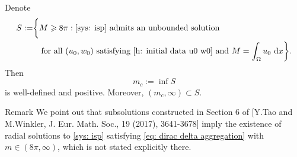 \begin{frame}

\begin{corollary}
	Denote
	\begin{equation}\nonumber
	\begin{split}
	S:= &\biggl\{ M \geqslant 8\pi :
        \eqref{sys: isp} \text{ admits an unbounded solution }\\
    &\quad\text{for all } (u_0, w_0) \text{ satisfying } \eqref{h: initial data u0 w0} \text{ and } M=\int_\Omega u_0\ \mathrm d{x}\biggr\}.
	\end{split}
	\end{equation}
	Then
	\[m_c := \inf S\]
is well-defined and positive. Moreover, $(m_c,\infty)\subset S$.
\end{corollary}

\begin{block}{Remark}
  We point out that subsolutions  constructed in Section 6 of [Y.Tao and M.Winkler, J. Eur. Math. Soc., 19 (2017), 3641-3678] imply the existence of radial solutions to \eqref{sys: isp} satisfying \eqref{eq: dirac delta aggregation} with $m\in(8\pi,\infty)$, which is not stated explicitly there.
\end{block}

\end{frame}



